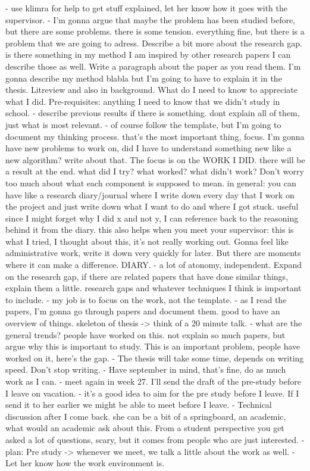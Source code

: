 - use klimra for help to get stuff explained, let her know how it goes with the supervisor.
- I'm gonna argue that maybe the problem has been studied before, but there are some problems. there is some tension. everything fine, but there is a problem that we are going to adress. Describe a bit more about the research gap. is there something in my method I am inspired by other research papers I can describe those as well. Write a paragraph about the paper as you read them. I'm gonna describe my method blabla but I'm going to have to explain it in the thesis. Litreview and also in background. What do I need to know to appreciate what I did. Pre-requisites: anything I need to know that we didn't study in school. 
- describe previous results if there is something. dont explain all of them, just what is most relevant.
- of course follow the template, but I'm going to document my thinking process. that's the most important thing, focus. I'm gonna have new problems to work on, did I have to understand something new like a new algorithm? write about that. The focus is on the WORK I DID. there will be a result at the end. what did I try? what worked? what didn't work? Don't worry too much about what each component is supposed to mean. in general: you can have like a research diary/journal where I write down every day that I work on the project and just write down what I want to do and where I got stuck. useful since I might forget why I did x and not y, I can reference back to the reasoning behind it from the diary. this also helps when you meet your supervisor: this is what I tried, I thought about this, it's not really working out. Gonna feel like administrative work, write it down very quickly for later. But there are moments where it can make a difference. DIARY.
- a lot of atonomy, independent. Expand on the research gap, if there are related papers that have done similar things, explain them a little. research gaps and whatever techniques I think is important to include. 
- my job is to focus on the work, not the template.
- as I read the papers, I'm gonna go through papers and document them. good to have an overview of things. skeleton of thesis -> think of a 20 minute talk. 
- what are the general trends? people have worked on this. not explain so much papers, but argue why this is important to study. This is an important problem, people have worked on it, here's the gap.
- The thesis will take some time, depends on writing speed. Don't stop writing.
- Have september in mind, that's fine, do as much work as I can.
- meet again in week 27. I'll send the draft of the pre-study before I leave on vacation.
- it's a good idea to aim for the pre study before I leave. If I send it to her earlier we might be able to meet before I leave.
- Technical discussion after I come back. she can be a bit of a springboard, an academic, what would an academic ask about this. From a student perspective you get asked a lot of questions, scary, but it comes from people who are just interested.
- plan: Pre study -> whenever we meet, we talk a little about the work as well. 
- Let her know how the work environment is.
